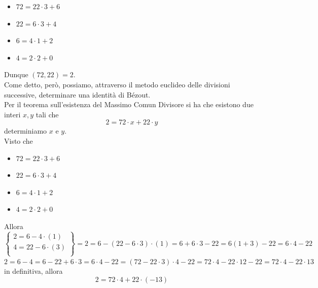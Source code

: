 \begin{flushleft}
\begin{esempio}[(72, 22) = ?]
\begin{itemize}
    \item[] $72 = 22 \cdot 3 + 6$
    \item[] $22 = 6 \cdot 3 + 4$
    \item[] $6 = 4 \cdot 1 + 2$
    \item[] $4 = 2 \cdot 2 + 0$
\end{itemize}
Dunque $(72, 22) = 2$.\\
Come detto, però, possiamo, attraverso il metodo euclideo delle divisioni successive, determinare una identità di Bézout.\\
Per il teorema sull'esistenza del Massimo Comun Divisore si ha che esistono due interi $x, y$ tali che
\[2 = 72 \cdot x + 22 \cdot y\]
determiniamo $x$ e $y$.\\
Visto che
\begin{itemize}
    \item[] $72 = 22 \cdot 3 + 6$
    \item[] $22 = 6 \cdot 3 + 4$
    \item[] $6 = 4 \cdot 1 + 2$
    \item[] $4 = 2 \cdot 2 + 0$
\end{itemize}
Allora\\
\vspace{10px}
$ \left.
  \begin{cases}
    2 = 6 - 4 \cdot(1)\\
    4 = 22 - 6 \cdot(3)\\
  \end{cases}
  \right\} = 2 = 6 - (22 -  6\cdot 3)\cdot (1) = 6 + 6\cdot 3 - 22 = 6(1+3) - 22 = 6 \cdot 4 - 22
$\\
$2 = 6 - 4 = 6 - 22 + 6\cdot 3 = 6 \cdot 4 - 22 = (72 - 22 \cdot 3) \cdot 4 - 22 = 72 \cdot 4 - 22 \cdot 12 - 22 = 72 \cdot 4 - 22 \cdot 13$
in definitiva, allora
\[2 = 72 \cdot 4 + 22 \cdot (-13)\]
\end{esempio}



\end{flushleft}
